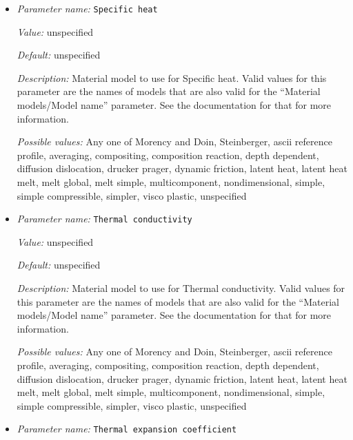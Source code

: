 \begin{itemize}
{\it Possible values:} Any one of Morency and Doin, Steinberger, ascii reference profile, averaging, compositing, composition reaction, depth dependent, diffusion dislocation, drucker prager, dynamic friction, latent heat, latent heat melt, melt global, melt simple, multicomponent, nondimensional, simple, simple compressible, simpler, visco plastic, unspecified
\item {\it Parameter name:} {\tt Specific heat}
\label{parameters:Material model/Compositing/Specific heat}


{\it Value:} unspecified


{\it Default:} unspecified


{\it Description:} Material model to use for Specific heat. Valid values for this parameter are the names of models that are also valid for the ``Material models/Model name'' parameter. See the documentation for that for more information.


{\it Possible values:} Any one of Morency and Doin, Steinberger, ascii reference profile, averaging, compositing, composition reaction, depth dependent, diffusion dislocation, drucker prager, dynamic friction, latent heat, latent heat melt, melt global, melt simple, multicomponent, nondimensional, simple, simple compressible, simpler, visco plastic, unspecified
\item {\it Parameter name:} {\tt Thermal conductivity}
\label{parameters:Material model/Compositing/Thermal conductivity}


{\it Value:} unspecified


{\it Default:} unspecified


{\it Description:} Material model to use for Thermal conductivity. Valid values for this parameter are the names of models that are also valid for the ``Material models/Model name'' parameter. See the documentation for that for more information.


{\it Possible values:} Any one of Morency and Doin, Steinberger, ascii reference profile, averaging, compositing, composition reaction, depth dependent, diffusion dislocation, drucker prager, dynamic friction, latent heat, latent heat melt, melt global, melt simple, multicomponent, nondimensional, simple, simple compressible, simpler, visco plastic, unspecified
\item {\it Parameter name:} {\tt Thermal expansion coefficient}
\label{parameters:Material model/Compositing/Thermal expansion coefficient}



\end{itemize}
